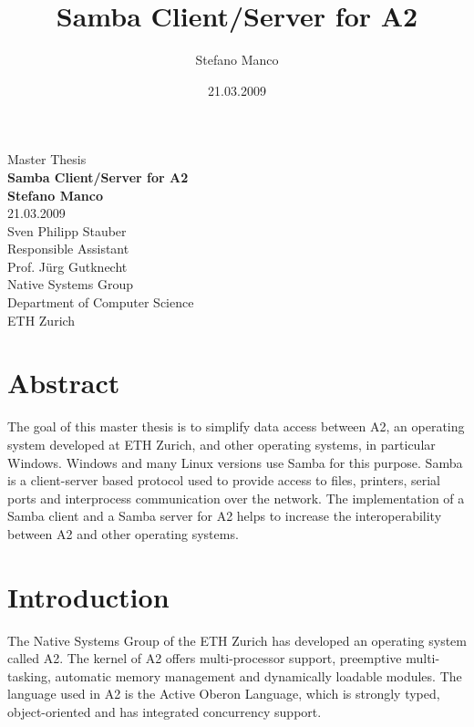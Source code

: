 \documentclass[11pt,a4paper]{book}
\author{Stefano Manco}
\title{Samba Client/Server for A2}
\date{21.03.2009}
\begin{document}
\frontmatter
\begin{titlepage}
\begin{center}
{\large Master Thesis} \\
{\huge\bf Samba Client/Server for A2} \\
{\Large\bf Stefano Manco} \\
21.03.2009 \\
Sven Philipp Stauber \\
{\footnotesize Responsible Assistant} \\
Prof. J\"{u}rg Gutknecht \\
Native Systems Group \\
Department of Computer Science \\
ETH Zurich \\
\end{center}
\end{titlepage}

\chapter*{Abstract}
The goal of this master thesis is to simplify data access between A2, an operating system developed at ETH Zurich, and other operating systems, in particular Windows. Windows and many Linux versions use Samba for this purpose. Samba is a client-server based protocol used to provide access to files, printers, serial ports and interprocess communication over the network. The implementation of a Samba client and a Samba server for A2 helps to increase the interoperability between A2 and other operating systems. 

\tableofcontents

\mainmatter

\chapter{Introduction}
The Native Systems Group of the ETH Zurich has developed an operating system called A2. The kernel of A2 offers multi-processor support, preemptive multi-tasking, automatic memory management and dynamically loadable modules. The language used in A2 is the Active Oberon Language, which is strongly typed, object-oriented and has integrated concurrency support.
\end{document}
